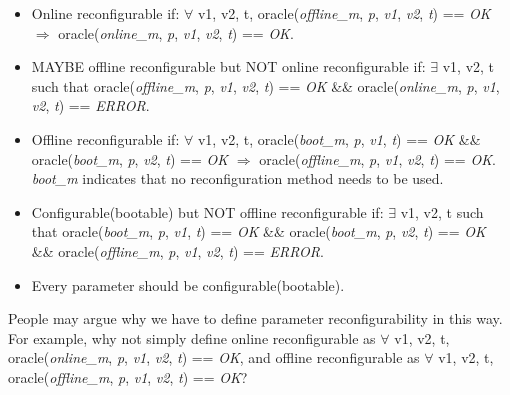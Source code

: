 \begin{itemize}[leftmargin=*]
\vspace{-.1in}
\item 

Online reconfigurable if: $\forall$ v1, v2, t, oracle(\textit{offline\_m}, \textit{p}, \textit{v1}, \textit{v2}, \textit{t}) == \textit{OK} $\Longrightarrow$ oracle(\textit{online\_m}, \textit{p}, \textit{v1}, \textit{v2}, \textit{t}) == \textit{OK}.

\vspace{-.1in}
\item 
MAYBE offline reconfigurable but NOT online reconfigurable if: $\exists$ v1, v2, t such that oracle(\textit{offline\_m}, \textit{p}, \textit{v1}, \textit{v2}, \textit{t}) == \textit{OK} \&\& oracle(\textit{online\_m}, \textit{p}, \textit{v1}, \textit{v2}, \textit{t}) == \textit{ERROR}.

\vspace{-.1in}
\item 
Offline reconfigurable if: $\forall$ v1, v2, t, oracle(\textit{boot\_m}, \textit{p}, \textit{v1}, \textit{t}) == \textit{OK} \&\& oracle(\textit{boot\_m}, \textit{p}, \textit{v2}, \textit{t}) == \textit{OK} $\Longrightarrow$ oracle(\textit{offline\_m}, \textit{p}, \textit{v1}, \textit{v2}, \textit{t}) == \textit{OK}. \textit{boot\_m} indicates that no reconfiguration method needs to be used. 

\vspace{-.1in}
\item 
Configurable(bootable) but NOT offline reconfigurable if: $\exists$ v1, v2, t such that oracle(\textit{boot\_m}, \textit{p}, \textit{v1}, \textit{t}) == \textit{OK} \&\& oracle(\textit{boot\_m}, \textit{p}, \textit{v2}, \textit{t}) == \textit{OK} \&\& oracle(\textit{offline\_m}, \textit{p}, \textit{v1}, \textit{v2}, \textit{t}) == \textit{ERROR}.

\vspace{-.1in}
\item 
Every parameter should be configurable(bootable).
\end{itemize}

People may argue why we have to define parameter reconfigurability in this way. For example, why not simply define online reconfigurable as $\forall$ v1, v2, t, oracle(\textit{online\_m}, \textit{p}, \textit{v1}, \textit{v2}, \textit{t}) == \textit{OK}, and offline reconfigurable as $\forall$ v1, v2, t, oracle(\textit{offline\_m}, \textit{p}, \textit{v1}, \textit{v2}, \textit{t}) == \textit{OK}?

